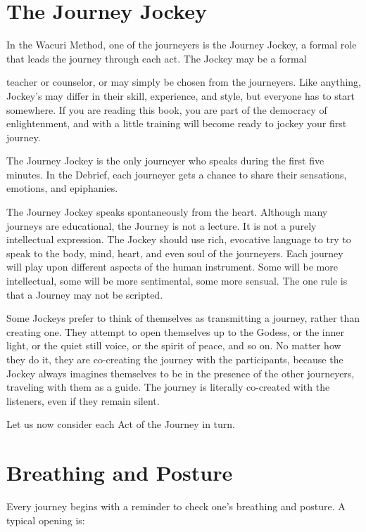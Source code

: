 \documentclass[12pt]{book}
\begin{document}
\section{The Journey Jockey}

In the Wacuri Method, one of the journeyers is the Journey Jockey, a formal role that leads the journey through each act. The Jockey may be a formal
					
teacher or counselor, or may simply be chosen from the journeyers. Like anything, Jockey’s may differ in their skill, experience, and style, but everyone has to start somewhere. If you are reading this book, you are part of the democracy of enlightenment, and with a little training will become  ready to jockey your first journey.
					
The Journey Jockey is the only journeyer who speaks during the first five minutes. In the Debrief, each journeyer gets a chance to share their sensations, emotions, and epiphanies.
					
The Journey Jockey speaks spontaneously from the heart. Although many journeys are educational, the Journey is not a lecture. It is not a purely intellectual expression. The Jockey should use rich, evocative language to try to speak to the body, mind, heart, and even soul of the journeyers. Each journey will play upon different aspects of the human instrument. Some will be more intellectual, some will be more sentimental, some more sensual. The one rule is that a Journey may not be scripted.
					
Some Jockeys prefer to think of themselves as transmitting a journey, rather than creating one. They attempt to open themselves up to the Godess, or the inner light, or the quiet still voice, or the spirit of peace, and so on. No matter how they do it, they are co-creating the journey with the participants, because the Jockey always imagines themselves to be in the presence of the other journeyers, traveling with them as a guide. The journey is literally co-created with the listeners, even if they remain silent.
					
Let us now consider each Act of the Journey in turn.
					
\section{Breathing and Posture}
					
Every journey begins with a reminder to check one’s breathing and posture. A typical opening is:
					
\end{document}
